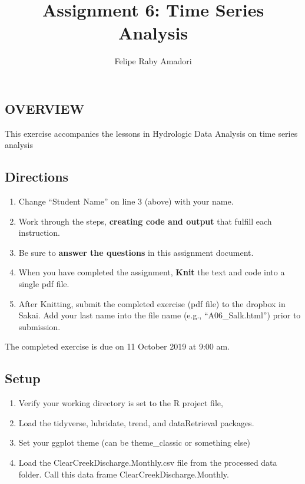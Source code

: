 \documentclass[]{article}
\title{Assignment 6: Time Series Analysis}
\author{Felipe Raby Amadori}
\date{}
\providecommand{\tightlist}{%
  \setlength{\itemsep}{0pt}\setlength{\parskip}{0pt}}
\begin{document}
\maketitle

\hypertarget{overview}{%
\subsection{OVERVIEW}\label{overview}}

This exercise accompanies the lessons in Hydrologic Data Analysis on
time series analysis

\hypertarget{directions}{%
\subsection{Directions}\label{directions}}

\begin{enumerate}
\def\labelenumi{\arabic{enumi}.}
\tightlist
\item
  Change ``Student Name'' on line 3 (above) with your name.
\item
  Work through the steps, \textbf{creating code and output} that fulfill
  each instruction.
\item
  Be sure to \textbf{answer the questions} in this assignment document.
\item
  When you have completed the assignment, \textbf{Knit} the text and
  code into a single pdf file.
\item
  After Knitting, submit the completed exercise (pdf file) to the
  dropbox in Sakai. Add your last name into the file name (e.g.,
  ``A06\_Salk.html'') prior to submission.
\end{enumerate}

The completed exercise is due on 11 October 2019 at 9:00 am.

\hypertarget{setup}{%
\subsection{Setup}\label{setup}}

\begin{enumerate}
\def\labelenumi{\arabic{enumi}.}
\tightlist
\item
  Verify your working directory is set to the R project file,
\item
  Load the tidyverse, lubridate, trend, and dataRetrieval packages.
\item
  Set your ggplot theme (can be theme\_classic or something else)
\item
  Load the ClearCreekDischarge.Monthly.csv file from the processed data
  folder. Call this data frame ClearCreekDischarge.Monthly.
\end{enumerate}
\end{document}

